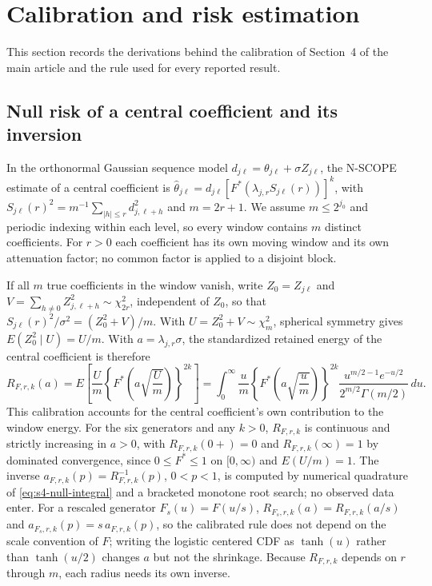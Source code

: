 \documentclass[11pt]{article}
\numberwithin{equation}{section}
\begin{document}
\section{Calibration and risk estimation}\label{sec:s4-calibration}

This section records the derivations behind the calibration of Section~4 of the main article and the rule used for every reported result.

\subsection{Null risk of a central coefficient and its inversion}
\label{sec:s4-null}
In the orthonormal Gaussian sequence model $d_{j\ell}=\theta_{j\ell}+\sigma Z_{j\ell}$, the N-SCOPE estimate of a central coefficient is $\widehat\theta_{j\ell}=d_{j\ell}[F^*(\lambda_{j,r}S_{j\ell}(r))]^k$, with $S_{j\ell}(r)^2=m^{-1}\sum_{|h|\le r}d_{j,\ell+h}^2$ and $m=2r+1$. We assume $m\le2^{j_0}$ and periodic indexing within each level, so every window contains $m$ distinct coefficients. For $r>0$ each coefficient has its own moving window and its own attenuation factor; no common factor is applied to a disjoint block.

If all $m$ true coefficients in the window vanish, write $Z_0=Z_{j\ell}$ and $V=\sum_{h\ne0}Z_{j,\ell+h}^2\sim\chi^2_{2r}$, independent of $Z_0$, so that $S_{j\ell}(r)^2/\sigma^2=(Z_0^2+V)/m$. With $U=Z_0^2+V\sim\chi^2_m$, spherical symmetry gives $E(Z_0^2\mid U)=U/m$. With $a=\lambda_{j,r}\sigma$, the standardized retained energy of the central coefficient is therefore
\begin{equation}
R_{F,r,k}(a)=E\!\left[\frac{U}{m}\left\{F^*\!\left(a\sqrt{\frac{U}{m}}\right)\right\}^{2k}\right]
=\int_0^\infty\frac{u}{m}\left\{F^*\!\left(a\sqrt{\frac{u}{m}}\right)\right\}^{2k}
\frac{u^{m/2-1}e^{-u/2}}{2^{m/2}\Gamma(m/2)}\,du .
\label{eq:s4-null-integral}
\end{equation}
This calibration accounts for the central coefficient's own contribution to the window energy. For the six generators and any $k>0$, $R_{F,r,k}$ is continuous and strictly increasing in $a>0$, with $R_{F,r,k}(0+)=0$ and $R_{F,r,k}(\infty)=1$ by dominated convergence, since $0\le F^*\le1$ on $[0,\infty)$ and $E(U/m)=1$. The inverse $a_{F,r,k}(p)=R_{F,r,k}^{-1}(p)$, $0<p<1$, is computed by numerical quadrature of \eqref{eq:s4-null-integral} and a bracketed monotone root search; no observed data enter. For a rescaled generator $F_s(u)=F(u/s)$, $R_{F_s,r,k}(a)=R_{F,r,k}(a/s)$ and $a_{F_s,r,k}(p)=s\,a_{F,r,k}(p)$, so the calibrated rule does not depend on the scale convention of $F$; writing the logistic centered CDF as $\tanh(u)$ rather than $\tanh(u/2)$ changes $a$ but not the shrinkage. Because $R_{F,r,k}$ depends on $r$ through $m$, each radius needs its own inverse.
\end{document}

